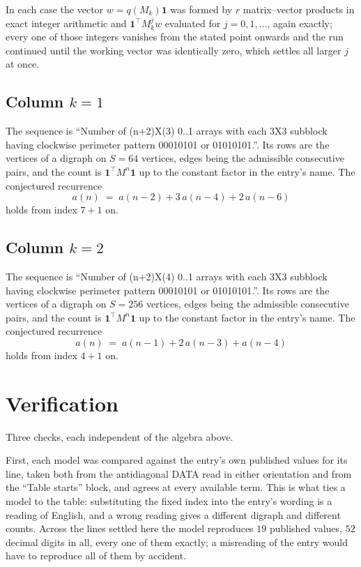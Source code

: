 \documentclass[11pt,a4paper]{article}
\theoremstyle{plain}
\theoremstyle{definition}
\begin{document}
In each case the vector $w=q(M_k)\mathbf{1}$ was formed by $r$ matrix--vector products in
exact integer arithmetic and $\mathbf{1}^{\!\top}M_k^{j}w$ evaluated for $j=0,1,\dots$,
again exactly; every one of those integers vanishes from the stated point onwards and the run
continued until the working vector was identically zero, which settles all larger $j$ at once.

\subsection*{Column $k$$=1$}
The sequence is ``Number of (n+2)X(3) 0..1 arrays with each 3X3 subblock having clockwise perimeter pattern 00010101 or 01010101.''. Its rows are the vertices of a digraph on
$S=64$ vertices, edges being the admissible consecutive pairs, and the count is
$\mathbf{1}^{\!\top}M^{n}\mathbf{1}$ up to the constant factor in the entry's name.
The conjectured recurrence
\[
a(n)\;=\;a(n-2) + 3\,a(n-4) + 2\,a(n-6)
\]
holds from index $7+1$ on.

\subsection*{Column $k$$=2$}
The sequence is ``Number of (n+2)X(4) 0..1 arrays with each 3X3 subblock having clockwise perimeter pattern 00010101 or 01010101.''. Its rows are the vertices of a digraph on
$S=256$ vertices, edges being the admissible consecutive pairs, and the count is
$\mathbf{1}^{\!\top}M^{n}\mathbf{1}$ up to the constant factor in the entry's name.
The conjectured recurrence
\[
a(n)\;=\;a(n-1) + 2\,a(n-3) + a(n-4)
\]
holds from index $4+1$ on.

\section{Verification}

Three checks, each independent of the algebra above.

First, each model was compared against the entry's own published values for its line, taken
both from the antidiagonal DATA read in either orientation and from the ``Table starts''
block, and agrees at every available term. This is what ties a model to the table:
substituting the fixed index into the entry's wording is a reading of English, and a wrong
reading gives a different digraph and different counts. Across the lines settled here the
model reproduces $19$ published values, $52$ decimal digits in all, every one of
them exactly; a misreading of the entry would have to reproduce all of them by accident.
\end{document}
